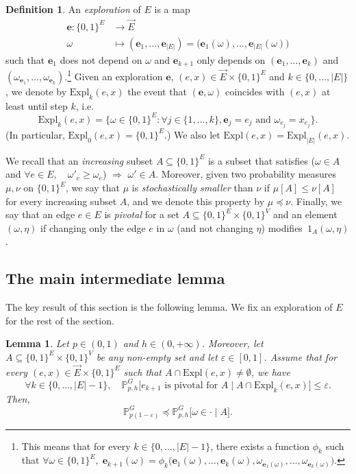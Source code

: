 \documentclass[10pt]{amsart}
\newtheorem{lemm}[theo]{Lemma}\newtheorem{prop}[theo]{Proposition}\newtheorem{coro}[theo]{Corollary}\newtheorem{conj}[theo]{Conjecture}
\theoremstyle{definition}\newtheorem{defi}[theo]{Definition}\newtheorem{rema}[theo]{Remark}\newtheorem{exam}[theo]{Example}\newtheorem{exem}[theo]{Example}\newtheorem{nota}[theo]{Notation}
\newcommand{\Pro}{\mathbb{P}}
\newcommand{\ee}{\mathbf{e}}
\newcommand{\Expl}{\mathrm{Expl}}
\let\oldforall\forall
\renewcommand*{\forall}{\mathrel{\oldforall}}
\begin{document}
\begin{defi}\label{defi:expl}
An \emph{exploration} of $E$ is a map
\begin{align*}
\ee : \{0,1\}^E & \longrightarrow \vec{E}\\
\omega & \longmapsto (\ee_1,\dots,\ee_{|E|})=\big(\ee_1(\omega),\dots,\ee_{|E|}(\omega)\big)
\end{align*}
such that $\ee_1$ does not depend on $\omega$ and $\ee_{k+1}$ only depends on $(\ee_1,\dots,\ee_k)$ and $(\omega_{\ee_1},\dots,\omega_{\ee_k})$.\footnote{This means that for every $k \in \{0,\dots,|E|-1\}$, there exists a function $\phi_k$ such that $\forall \omega \in \{0,1\}^E, \; \ee_{k+1}(\omega)=\phi_k\big(\ee_1(\omega),\dots,\ee_k(\omega),\omega_{\ee_1(\omega)},\dots,\omega_{\ee_k(\omega)})$.}
Given an exploration $\ee$, $(e,x) \in \vec{E}\times\{0,1\}^E$ and $k \in \{0,\dots,|E|\}$, we denote by $\Expl_k(e,x)$ the event that $(\ee,\omega)$ coincides with $(e,x)$ at least until step $k$, i.e.
\[
\Expl_k(e,x)=\big\{\omega \in \{0,1\}^E : \forall j \in \{1,\dots,k\}, \ee_j=e_j\text{ and }\omega_{e_j}=x_{e_j}\big\}.
\]
(In particular, $\Expl_0(e,x)=\{0,1\}^E$.) We also let $\Expl(e,x)=\Expl_{|E|}(e,x)$.
\end{defi}

We recall that an \emph{increasing} subset $A\subseteq\{0,1\}^E$ is a subset that satisfies ($\omega \in A$ and $\forall e \in E, \quad \omega'_e \ge \omega_e$) $\Rightarrow$ $\omega'\in A$. Moreover, given two probability measures $\mu,\nu$ on $\{0,1\}^E$, we say that $\mu$ is \emph{stochastically smaller} than $\nu$ if $\mu[A]\le \nu[A]$ for every increasing subset $A$, and we denote this property by $\mu \preceq \nu$. Finally, we say that an edge $e \in E$ is \emph{pivotal} for a set $A \subseteq \{0,1\}^E \times \{0,1\}^V$ and an element~$(\omega,\eta)$ if changing only the edge $e$ in $\omega$ (and not changing $\eta$) modifies~$1_A(\omega,\eta)$.

\subsection{The main intermediate lemma}

The key result of this section is the following lemma. We fix an exploration of $E$ for the rest of the section.

\begin{lemm}\label{lem:coupl}
Let $p \in (0,1)$ and $h \in (0,+\infty)$. Moreover, let $A \subseteq \{0,1\}^E \times \{0,1\}^V$ be any non-empty set and let $\varepsilon \in [0,1]$. Assume that for every $(e,x) \in \vec{E}\times\{0,1\}^E$ such that $A \cap \Expl(e,x)\neq \emptyset$, we have
\[
\forall k \in \{0,\dots,|E|-1\}, \quad \Pro_{p,h}^G \big[\text{$e_{k+1}$ is pivotal for $A$} \; \big| \; A \cap \Expl_k(e,x) \big] \le \varepsilon.
\]
Then,
\[
\Pro_{p(1-\varepsilon)}^G \preceq \Pro_{p,h}^G \big[\omega \in \cdot \; \big| \; A \big].
\]
\end{lemm}
\end{document}
